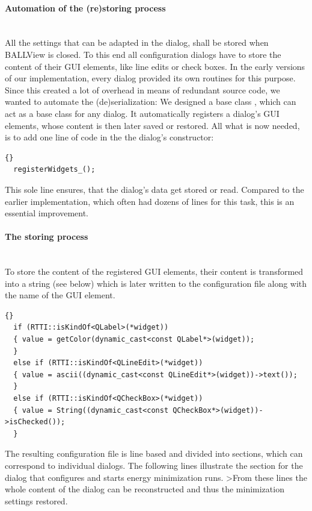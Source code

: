 \paragraph{Automation of the (re)storing process}
\hspace*{\fill}\\
All the settings that can be adapted in the  dialog, shall 
be stored when \mbox{BALLView} is closed. To this end all configuration 
dialogs have to store the content of their GUI elements, like line edits or 
check boxes. In the early versions of our implementation, every dialog 
provided its own routines for this purpose. Since this created a lot of 
overhead in means of redundant source code, we wanted to automate the 
(de)serialization: We designed a base class , which 
can act as a base class for any dialog. It automatically registers a dialog's 
GUI elements, whose content is then later saved or restored. All what is now 
needed, is to add one line of code in the the dialog's constructor:

\begin{lstlisting}{}
  registerWidgets_();
\end{lstlisting}

\noindent
This sole line ensures, that the dialog's data get stored or read. Compared to
the earlier implementation, which often had dozens of lines for this task, 
this is an essential improvement.

\paragraph{The storing process}
\hspace*{\fill}\\
To store the content of the registered GUI elements, their content is 
transformed into a string (see below) which is later written to the 
configuration file along with the name of the GUI element.

\begin{lstlisting}{}
  if (RTTI::isKindOf<QLabel>(*widget))
  { value = getColor(dynamic_cast<const QLabel*>(widget));
  }
  else if (RTTI::isKindOf<QLineEdit>(*widget))
  { value = ascii((dynamic_cast<const QLineEdit*>(widget))->text());
  }
  else if (RTTI::isKindOf<QCheckBox>(*widget))
  { value = String((dynamic_cast<const QCheckBox*>(widget))->isChecked());
  }
\end{lstlisting}

The resulting configuration file is line based and divided into sections,
which can correspond to individual dialogs. The following lines illustrate
the section for the dialog that configures and starts energy minimization runs.
>From these lines the whole content of the dialog can be reconstructed and thus 
the minimization settings restored.

